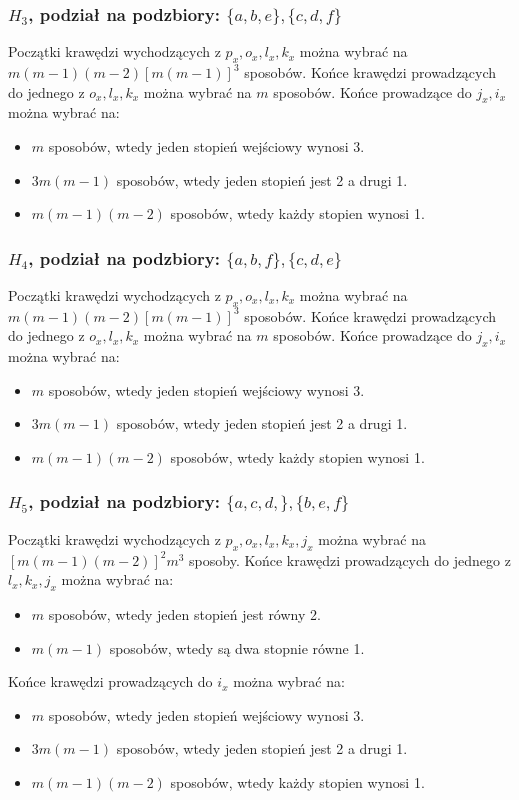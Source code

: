 \documentclass{article}
\begin{document}
\subsubsection{$H_3$, podział na podzbiory: $\{ a,b,e \}, \{ c,d,f \}$}
Początki krawędzi wychodzących z $p_x,o_x,l_x,k_x$ można wybrać na $m(m-1)(m-2)[m(m-1)]^3$ sposobów. Końce krawędzi prowadzących do jednego z $o_x, l_x, k_x$ można wybrać na $m$ sposobów. Końce prowadzące do $j_x,i_x$ można wybrać na:
\begin{itemize}
  \item $m$ sposobów, wtedy jeden stopień wejściowy wynosi 3.
  \item $3m(m-1)$ sposobów, wtedy jeden stopień jest 2 a drugi 1.
  \item $m(m-1)(m-2)$ sposobów, wtedy każdy stopien wynosi 1.
\end{itemize}

\subsubsection{$H_4$, podział na podzbiory: $\{ a,b,f \}, \{ c,d,e \}$}
Początki krawędzi wychodzących z $p_x,o_x,l_x,k_x$ można wybrać na $m(m-1)(m-2)[m(m-1)]^3$ sposobów. Końce krawędzi prowadzących do jednego z $o_x, l_x, k_x$ można wybrać na $m$ sposobów. Końce prowadzące do $j_x,i_x$ można wybrać na:
\begin{itemize}
  \item $m$ sposobów, wtedy jeden stopień wejściowy wynosi 3.
  \item $3m(m-1)$ sposobów, wtedy jeden stopień jest 2 a drugi 1.
  \item $m(m-1)(m-2)$ sposobów, wtedy każdy stopien wynosi 1.
\end{itemize}

\subsubsection{$H_5$, podział na podzbiory: $\{ a,c,d, \}, \{ b,e,f \}$}
Początki krawędzi wychodzących z $p_x,o_x,l_x,k_x,j_x$ można wybrać na $[m(m-1)(m-2)]^2m^3$ sposoby. Końce krawędzi prowadzących do jednego z $l_x,k_x,j_x$ można wybrać na:
\begin{itemize}
  \item $m$ sposobów, wtedy jeden stopień jest równy 2.
  \item $m(m-1)$ sposobów, wtedy są dwa stopnie równe 1.
\end{itemize}
Końce krawędzi prowadzących do $i_x$ można wybrać na:
\begin{itemize}
  \item $m$ sposobów, wtedy jeden stopień wejściowy wynosi 3.
  \item $3m(m-1)$ sposobów, wtedy jeden stopień jest 2 a drugi 1.
  \item $m(m-1)(m-2)$ sposobów, wtedy każdy stopien wynosi 1.
\end{itemize}
\end{document}
